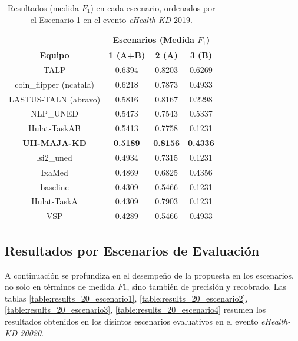 \begin{table}[tb!]\centering
	 
	\begin{tabular}{|c|c|c|c|}
		\hline
		&  \multicolumn{3}{c|}{\textbf{Escenarios (Medida $F_1$)}} \\
		\hline
		\textbf{Equipo} & \textbf{1 (A+B)} & \textbf{2 (A)} & \textbf{3 (B)} \\
		\hline
		TALP	          	   &  0.6394 &  0.8203 &  0.6269 \\
		coin\_flipper (ncatala) & 0.6218 &  0.7873 &  0.4933 \\	
		LASTUS-TALN (abravo)   & 0.5816 &  0.8167 &  0.2298	\\
		NLP\_UNED               & 0.5473 &  0.7543 &  0.5337 \\
		Hulat-TaskAB           & 0.5413 &  0.7758 &  0.1231 \\	
		\textbf{UH-MAJA-KD}    & \textbf{0.5189} &  \textbf{0.8156} &  \textbf{0.4336} \\	
		lsi2\_uned              & 0.4934 &  0.7315 &  0.1231	\\
		IxaMed                 & 0.4869 &  0.6825 &  0.4356 \\
		baseline               & 0.4309 &  0.5466 &  0.1231 \\
		Hulat-TaskA            & 0.4309 &  0.7903 &  0.1231 \\	
		VSP             	   & 0.4289 &  0.5466 &  0.4933 \\	
		\hline
	\end{tabular}
	\caption{Resultados (medida $F_1$) en cada escenario, ordenados por el Escenario 1 en el evento \textit{eHealth-KD} 2019.\label{table:results_19}}
\end{table}

\subsection{Resultados por Escenarios de Evaluación}

A continuación se profundiza en el desempeño de la propuesta en los escenarios, no solo en términos de medida $F1$, sino también de precisión y recobrado.
Las tablas \ref{table:results_20_escenario1}, \ref{table:results_20_escenario2}, \ref{table:results_20_escenario3}, \ref{table:results_20_escenario4} resumen los resultados obtenidos en los disintos escenarios evaluativos en el evento \textit{eHealth-KD 20020}.

